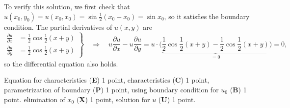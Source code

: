\begin{loesung}
To verify this solution, we first check that
$
u(x_0,y_0)
=
u(x_0,x_0)
=
\sin{\textstyle\frac12}(x_0+x_0)
=
\sin x_0$,
so it satisfies the boundary condition.
The partial derivatives of $u(x,y)$ are
\[
\left.
\begin{aligned}
\frac{\partial u}{\partial x}
&=
\frac12\cos{\textstyle\frac12}(x+y)
\\
\frac{\partial u}{\partial y}
&=
\frac12\cos{\textstyle\frac12}(x+y)
\end{aligned}
\right\}
\quad\Rightarrow\quad
u\frac{\partial u}{\partial x}-u\frac{\partial u}{\partial y}
=
u\cdot
\biggl(
\underbrace{
\frac12\cos{\textstyle\frac12}(x+y)
-
\frac12\cos{\textstyle\frac12}(x+y)
}_{\displaystyle=0}
\biggr)
=
0,
\]
so the differential equation also holds.
\end{loesung}

\begin{bewertung}
Equation for characteristics ({\bf E}) 1 point,
characteristics ({\bf C}) 1 point,
parametrization of boundary ({\bf P}) 1 point,
using boundary condition for $u_0$ ({\bf B}) 1 point.
elimination of $x_0$ ({\bf X}) 1 point,
solution for $u$ ({\bf U}) 1 point.
\end{bewertung}

